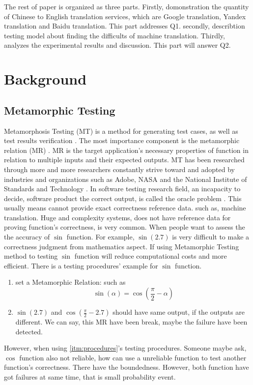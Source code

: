 \documentclass[conference]{IEEEtran}
\begin{document}
\begin{CJK*}{UTF8}{gbsn}
The rest of paper is organized as three parts. Firstly, domonstration the
quantity of Chinese to English translation services, which are Google
translation, Yandex translation and Baidu translation. This part addresses Q1.
secondly, describtion testing model about finding the difficults of machine
translation.
Thirdly, analyzes the experimental results and discussion. This part will
answer Q2.

\section{Background}
\subsection{Metamorphic Testing}
Metamorphosis Testing (MT) is a method for generating test cases, as well as test
results verification \cite{zhou2017introduction}. The most importance component is the metamorphic
relation (MR) \cite{chen2003fault}. MR is the target application's necessary
properties of function in relation to multiple inputs and their expected outputs.
MT has been researched through more and more researchers constantly strive
toward and adopted by industries and organizations such as Adobe, NASA and the
National Institute of Standards and Technology \cite{zhou2018metamorphic}.
In software testing research field, an incapacity to decide, software product
the correct output, is called the oracle problem \cite{brown2018metamorphic}.
This usually means cannot provide exact correctness reference data. such as,
machine translation. Huge and complexity systems, does not have
reference data for proving function's correctness, is very common.
When people want to assess the the accuracy of $\sin$ function. For example, $\sin(2.7)$ is very difficult to
make a correctness judgment from mathematics aspect. If using Metamorphic
Testing method to testing $\sin$ function will reduce computational costs and
more efficient. There is a testing procedures' example for $\sin$ function.
\begin{enumerate}\label{itm:procedures}
\item set a Metamorphic Relation: such as $$\sin(\alpha) = \cos(\frac{\pi}{2} - \alpha)$$
\item $\sin(2.7)$ and $\cos(\frac{\pi}{2} - 2.7)$ should have same output, if the
  outputs are different. We can say, this MR have been break, maybe the failure
  have been detected.
\end{enumerate}
However, when using \ref{itm:procedures}'s testing procedures. Someone maybe
ask, $\cos$ function also not reliable, how can use a unreliable function to
test another function's correctness. There have the boundedness. However, both
function have got failures at same time, that is small probability event.

\end{CJK*}
\end{document}
